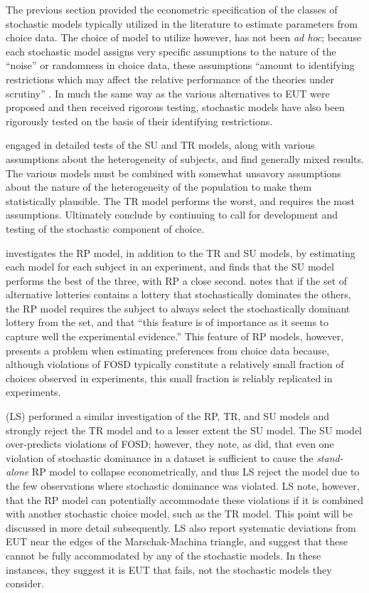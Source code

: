 \documentclass[../main.tex]{subfiles}
\begin{document}
The previous section provided the econometric specification of the classes of stochastic models typically utilized in the literature to estimate parameters from choice data.
The choice of model to utilize however, has not been \textit{ad hoc};
because each stochastic model assigns very specific assumptions to the nature of the \enquote{noise} or randomness in choice data, these assumptions \enquote{amount to identifying restrictions which may affect the relative performance of the theories under scrutiny} \parencite[1091]{Ballinger1997}.
In much the same way as the various alternatives to EUT were proposed and then received rigorous testing, stochastic models have also been rigorously tested on the basis of their identifying restrictions.

\textcite{Ballinger1997} engaged in detailed tests of the SU and TR models, along with various assumptions about the heterogeneity of subjects, and find generally mixed results.
The various models must be combined with somewhat unsavory assumptions about the nature of the heterogeneity of the population to make them statistically plausible.
The TR model performs the worst, and requires the most assumptions.
Ultimately \textcite[1104]{Ballinger1997} conclude by continuing to call for development and testing of the stochastic component of choice.

\textcite{Carbone1997} investigates the RP model, in addition to the TR and SU models, by estimating each model for each subject in an experiment, and finds that the SU model performs the best of the three, with RP a close second.
\textcite[307]{Carbone1997} notes that if the set of alternative lotteries contains a lottery that stochastically dominates the others, the RP model requires the subject to always select the stochastically dominant lottery from the set, and that \enquote{this feature is of importance as it seems to capture well the experimental evidence.}
This feature of RP models, however, presents a problem when estimating preferences from choice data because, although violations of FOSD typically constitute a relatively small fraction of choices observed in experiments, this small fraction is reliably replicated in experiments.

\textcite{Loomes1998} (LS) performed a similar investigation of the RP, TR, and SU models and strongly reject the TR model and to a lesser extent the SU model.
The SU model over-predicts violations of FOSD; however, they note, as \textcite{Carbone1997} did, that even one violation of stochastic dominance in a dataset is sufficient to cause the \textit{stand-alone} RP model to collapse econometrically, and thus LS reject the model due to the few observations where stochastic dominance was violated.
LS note, however, that the RP model can potentially accommodate these violations if it is combined with another stochastic choice model, such as the TR model.
This point will be discussed in more detail subsequently.
LS also report systematic deviations from EUT near the edges of the Marschak-Machina triangle,{\footnotemark} and suggest that these cannot be fully accommodated by any of the stochastic models.
In these instances, they suggest it is EUT that fails, not the stochastic models they consider.
\end{document}
